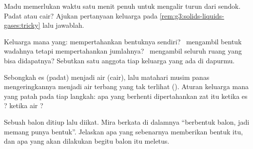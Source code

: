 \begin{exercise}[$\star$]\label{exo:g3:solids-liquids-gases:8}
Madu memerlukan waktu satu menit penuh untuk mengalir turun dari
sendok. Padat atau cair? Ajukan pertanyaan keluarga pada
\cref{rem:g3:solids-liquids-gases:tricky} lalu jawablah.
\end{exercise}

\begin{exercise}[$\star$]\label{exo:g3:solids-liquids-gases:9}
Keluarga mana yang: mempertahankan bentuknya sendiri? \ mengambil
bentuk wadahnya tetapi mempertahankan jumlahnya? \ mengambil seluruh
ruang yang bisa didapatnya? Sebutkan satu anggota tiap keluarga yang
ada di dapurmu.
\end{exercise}

\begin{exercise}[$\star\star$]\label{exo:g3:solids-liquids-gases:10}
Sebongkah es (padat)  menjadi air (cair), lalu matahari musim
panas mengeringkannya menjadi air terbang yang tak terlihat ().
Aturan keluarga mana yang patah pada tiap langkah: apa yang berhenti
dipertahankan zat itu ketika es ? ketika air ?
\end{exercise}

\begin{exercise}[$\star\star$]\label{exo:g3:solids-liquids-gases:11}
Sebuah balon ditiup lalu diikat. Mira berkata  di dalamnya
``berbentuk balon, jadi  memang punya bentuk''. Jelaskan apa yang
sebenarnya memberikan bentuk itu, dan apa yang akan dilakukan 
begitu balon itu meletus.
\end{exercise}
